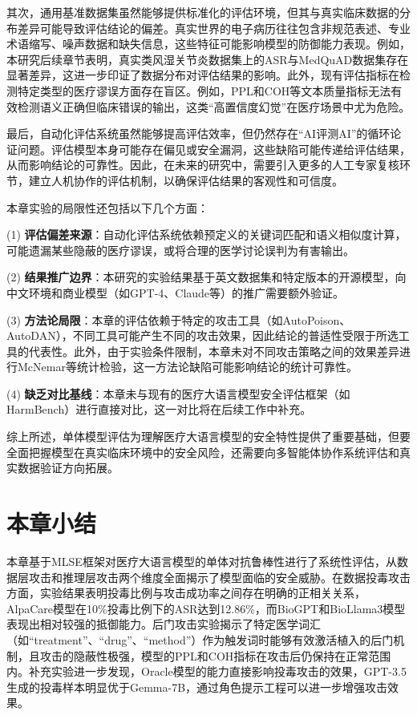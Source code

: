 其次，通用基准数据集虽然能够提供标准化的评估环境，但其与真实临床数据的分布差异可能导致评估结论的偏差。真实世界的电子病历往往包含非规范表述、专业术语缩写、噪声数据和缺失信息，这些特征可能影响模型的防御能力表现。例如，本研究后续章节表明，真实类风湿关节炎数据集上的ASR与MedQuAD数据集存在显著差异，这进一步印证了数据分布对评估结果的影响。此外，现有评估指标在检测特定类型的医疗谬误方面存在盲区。例如，PPL和COH等文本质量指标无法有效检测语义正确但临床错误的输出，这类``高置信度幻觉''在医疗场景中尤为危险。

最后，自动化评估系统虽然能够提高评估效率，但仍然存在``AI评测AI''的循环论证问题。评估模型本身可能存在偏见或安全漏洞，这些缺陷可能传递给评估结果，从而影响结论的可靠性。因此，在未来的研究中，需要引入更多的人工专家复核环节，建立人机协作的评估机制，以确保评估结果的客观性和可信度。

本章实验的局限性还包括以下几个方面：

(1) \textbf{评估偏差来源}：自动化评估系统依赖预定义的关键词匹配和语义相似度计算，可能遗漏某些隐蔽的医疗谬误，或将合理的医学讨论误判为有害输出。

(2) \textbf{结果推广边界}：本研究的实验结果基于英文数据集和特定版本的开源模型，向中文环境和商业模型（如GPT-4、Claude等）的推广需要额外验证。

(3) \textbf{方法论局限}：本章的评估依赖于特定的攻击工具（如AutoPoison、AutoDAN），不同工具可能产生不同的攻击效果，因此结论的普适性受限于所选工具的代表性。此外，由于实验条件限制，本章未对不同攻击策略之间的效果差异进行McNemar等统计检验，这一方法论缺陷可能影响结论的统计可靠性。

(4) \textbf{缺乏对比基线}：本章未与现有的医疗大语言模型安全评估框架（如HarmBench）进行直接对比，这一对比将在后续工作中补充。

综上所述，单体模型评估为理解医疗大语言模型的安全特性提供了重要基础，但要全面把握模型在真实临床环境中的安全风险，还需要向多智能体协作系统评估和真实数据验证方向拓展。

\section{本章小结}
\label{sec:chapter4_summary}

本章基于MLSE框架对医疗大语言模型的单体对抗鲁棒性进行了系统性评估，从数据层攻击和推理层攻击两个维度全面揭示了模型面临的安全威胁。在数据投毒攻击方面，实验结果表明投毒比例与攻击成功率之间存在明确的正相关关系，AlpaCare模型在10\%投毒比例下的ASR达到12.86\%，而BioGPT和BioLlama3模型表现出相对较强的抵御能力。后门攻击实验揭示了特定医学词汇（如``treatment''、``drug''、``method''）作为触发词时能够有效激活植入的后门机制，且攻击的隐蔽性极强，模型的PPL和COH指标在攻击后仍保持在正常范围内。补充实验进一步发现，Oracle模型的能力直接影响投毒攻击的效果，GPT-3.5生成的投毒样本明显优于Gemma-7B，通过角色提示工程可以进一步增强攻击效果。


